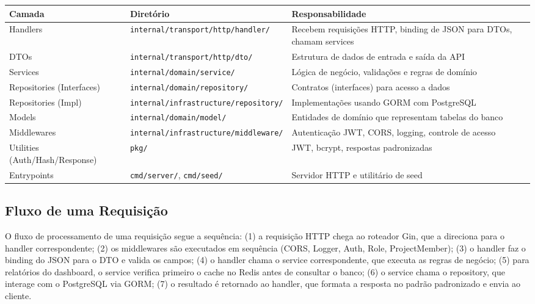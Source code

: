 \documentclass[a4paper,12pt,oneside]{article}
\begin{document}
\begin{table}[H]
\centering
\small
\begin{tabularx}{\textwidth}{l l X}
\toprule
\textbf{Camada} & \textbf{Diretório} & \textbf{Responsabilidade} \\
\midrule
Handlers & \texttt{internal/transport/http/handler/} & Recebem requisições HTTP, binding de JSON para DTOs, chamam services \\
DTOs & \texttt{internal/transport/http/dto/} & Estrutura de dados de entrada e saída da API \\
Services & \texttt{internal/domain/service/} & Lógica de negócio, validações e regras de domínio \\
Repositories (Interfaces) & \texttt{internal/domain/repository/} & Contratos (interfaces) para acesso a dados \\
Repositories (Impl) & \texttt{internal/infrastructure/repository/} & Implementações usando GORM com PostgreSQL \\
Models & \texttt{internal/domain/model/} & Entidades de domínio que representam tabelas do banco \\
Middlewares & \texttt{internal/infrastructure/middleware/} & Autenticação JWT, CORS, logging, controle de acesso \\
Utilities (Auth/Hash/Response) & \texttt{pkg/} & JWT, bcrypt, respostas padronizadas \\
Entrypoints & \texttt{cmd/server/}, \texttt{cmd/seed/} & Servidor HTTP e utilitário de seed \\
\bottomrule
\end{tabularx}
\end{table}

\subsection{Fluxo de uma Requisição}

O fluxo de processamento de uma requisição segue a sequência: (1) a requisição HTTP chega ao roteador Gin, que a direciona para o handler correspondente; (2) os middlewares são executados em sequência (CORS, Logger, Auth, Role, ProjectMember); (3) o handler faz o binding do JSON para o DTO e valida os campos; (4) o handler chama o service correspondente, que executa as regras de negócio; (5) para relatórios do dashboard, o service verifica primeiro o cache no Redis antes de consultar o banco; (6) o service chama o repository, que interage com o PostgreSQL via GORM; (7) o resultado é retornado ao handler, que formata a resposta no padrão padronizado e envia ao cliente.
\end{document}
